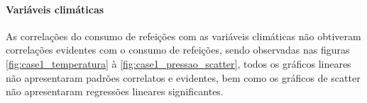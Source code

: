 \documentclass[	12pt, Times, openright, twoside, a4paper, english, brazil]{abntex2}
\begin{document}
              \paragraph{Variáveis climáticas}
                As correlações do consumo de refeições com as variáveis climáticas não obtiveram correlações evidentes com o consumo de refeições, sendo observadas nas figuras \ref{fig:case1_temperatura} à \ref{fig:case1_pressao_scatter}, todos os gráficos lineares não apresentaram padrões correlatos e evidentes, bem como os gráficos de scatter não apresentaram regressões lineares significantes.
                
                
                {\begin{center} \begin{minipage}[c]{0.6\textwidth}\begin{figure}[H]
                    \end{figure}\end{minipage} \hfill %
                      \begin{minipage}[c]{0.3\textwidth}
                \begin{figure}[H]
                \end{figure}\end{minipage} \end{center} }
                
\end{document}
